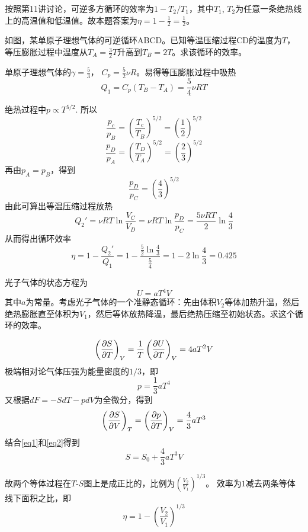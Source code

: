 \documentclass[CJK]{beamer}
\begin{document}
\begin{frame}
  \bch
  按照第11讲讨论，可逆多方循环的效率为$1-T_2/T_1$，其中$T_1$, $T_2$为任意一条绝热线上的高温值和低温值。故本题答案为$\eta = 1 - \frac{1}{2} = \frac{1}{2}$。
  \ech
\end{frame}

\begin{frame}
  \chtitle{\proid (\sthree)}
  \bch

  如图，某单原子理想气体的可逆循环ABCD。已知等温压缩过程CD的温度为$T$，等压膨胀过程中温度从$T_A=\frac{3}{2}T$升高到$T_B=2T$。求该循环的效率。
  
  \ech
\end{frame}

\begin{frame}
  \bch
  {\scriptsize
  单原子理想气体的$\gamma = \frac{5}{3}$， $C_p = \frac{5}{2}\nu R$。易得等压膨胀过程中吸热
  $$Q_1 = C_p(T_B-T_A) = \frac{5}{4}\nu R T$$

  绝热过程中$p \propto T^{5/2}$.
  所以
  $$\frac{p_c}{p_B} = \left(\frac{T_c}{T_B}\right)^{5/2} = \left(\frac{1}{2}\right)^{5/2}$$
  $$\frac{p_D}{p_A} =\left(\frac{T_D}{T_A}\right)^{5/2} = \left(\frac{2}{3}\right)^{5/2}$$
  再由$p_A=p_B$，得到
  $$\frac{p_D}{p_C} =   \left(\frac{4}{3}\right)^{5/2}$$
  由此可算出等温压缩过程放热
  $$ Q_2' = \nu R T \ln \frac{V_C}{V_D} = \nu R T \ln \frac{p_D}{p_C} = \frac{5\nu RT}{2} \ln\frac{4}{3} $$
  从而得出循环效率
  $$\eta = 1 - \frac{Q_2'}{Q_1} = 1 - \frac{\frac{5}{2}\ln\frac{4}{3}}{\frac{5}{4}} = 1-2\ln\frac{4}{3} = 0.425 $$
  }
  \ech
\end{frame}

\begin{frame}
  \chtitle{\proid (\sfour)}
  \bch
  光子气体的状态方程为
  $$ U = a T^4 V$$
  其中$a$为常量。考虑光子气体的一个准静态循环：先由体积$V_2$等体加热升温，然后绝热膨胀直至体积为$V_1$，然后等体放热降温，最后绝热压缩至初始状态。求这个循环的效率。
  \ech
\end{frame}


\begin{frame}
  \bch
  {\scriptsize

\begin{equation}
    \left(\frac{\partial S}{\partial T}\right)_{V} = \frac{1}{T}\left(\frac{\partial U}{\partial T}\right)_{V} = 4aT^2 V \label{eq1}
\end{equation}
极端相对论气体压强为能量密度的$1/3$，即
$$p = \frac{1}{3}aT^4$$
又根据$ dF = -SdT - pdV$为全微分，得到
\begin{equation}
  \left(\frac{\partial S}{\partial V}\right)_{T} = \left(\frac{\partial p}{\partial T}\right)_{V} = \frac{4}{3}aT^3 \label{eq2}
\end{equation}
  结合\eqref{eq1}和\eqref{eq2}得到
  $$ S = S_0 + \frac{4}{3} aT^3 V $$
  
  故两个等体过程在$T$-$S$图上是成正比的，比例为$\left(\frac{V_2}{V_1}\right)^{1/3}$。
  效率为$1$减去两条等体线下面积之比，即
  $$\eta = 1 - \left(\frac{V_2}{V_1}\right)^{1/3}$$
  }
  \ech
\end{frame}
\end{document}

